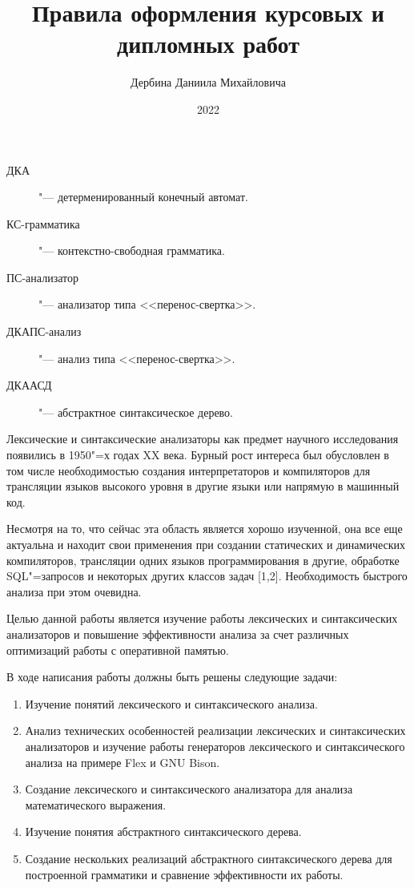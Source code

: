 \documentclass[bachelor, och, coursework]{SCWorks}
\begin{document}
\title{Правила оформления курсовых и дипломных работ}
\author{Дербина Даниила Михайловича}
\date{2022}
\maketitle
\tableofcontents
\abbreviations
\begin{description}
    \item[ДКА] "--- детерменированный конечный автомат.
    \item[КС-грамматика] "--- контекстно-свободная грамматика.
    \item[ПС-анализатор] "--- анализатор типа <<перенос-свертка>>.
    \item[ДКАПС-анализ] "--- анализ типа <<перенос-свертка>>.
    \item[ДКААСД] "--- абстрактное синтаксическое дерево.
\end{description}
\intro
Лексические и синтаксические анализаторы как предмет научного 
исследования появились в 1950"=х годах XX века. 
Бурный рост интереса был обусловлен в том числе необходимостью 
создания интерпретаторов и компиляторов для
трансляции языков высокого уровня в другие языки 
или напрямую в машинный код.

Несмотря на то, что сейчас эта область является хорошо изученной, 
она все еще актуальна и находит свои применения при создании 
статических и динамических компиляторов, трансляции одних 
языков программирования в другие, обработке SQL"=запросов 
и некоторых других классов задач [1,2]. Необходимость 
быстрого анализа при этом очевидна.

Целью данной работы является изучение работы лексических 
и синтаксических анализаторов и повышение эффективности анализа 
за счет различных оптимизаций работы с оперативной памятью.

В ходе написания работы должны быть решены следующие задачи:
\begin{enumerate}
    \item Изучение понятий лексического и синтаксического анализа.
    \item Анализ технических особенностей реализации лексических 
    и синтаксических анализаторов и изучение работы генераторов 
    лексического и синтаксического анализа на примере Flex и GNU Bison.
    \item Создание лексического и синтаксического анализатора для 
    анализа математического выражения.
    \item Изучение понятия абстрактного синтаксического дерева.
    \item Создание нескольких реализаций абстрактного 
    синтаксического дерева для построенной грамматики 
    и сравнение эффективности их работы.
\end{enumerate}
\end{document}
